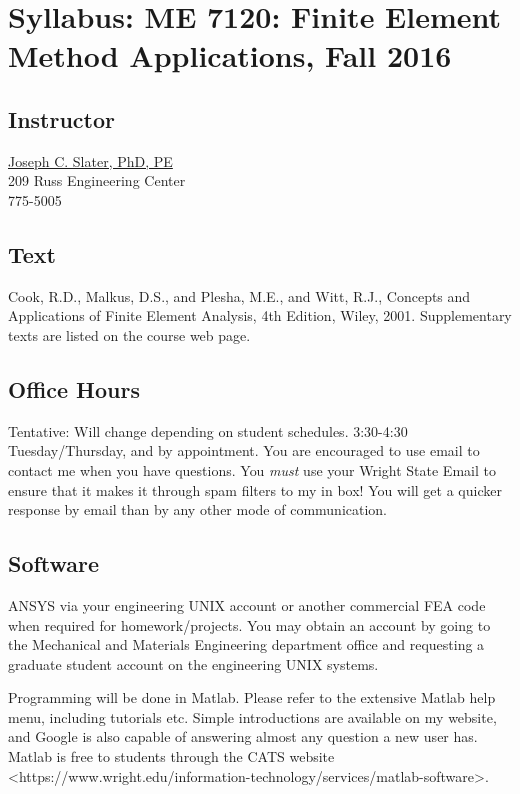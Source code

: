 \section{Syllabus: ME 7120: Finite Element Method Applications, Fall
2016}\label{syllabus-me-7120-finite-element-method-applications-fall-2016}

\subsection{Instructor}\label{instructor}

\href{http://www.cs.wright.edu/~jslater}{Joseph C. Slater, PhD, PE}\\
209 Russ Engineering Center\\
775-5005

\subsection{Text}\label{text}

Cook, R.D., Malkus, D.S., and Plesha, M.E., and Witt, R.J., Concepts and
Applications of Finite Element Analysis, 4th Edition, Wiley, 2001.
Supplementary texts are listed on the course web page.

\subsection{Office Hours}\label{office-hours}

Tentative: Will change depending on student schedules. 3:30-4:30
Tuesday/Thursday, and by appointment. You are encouraged to use email to
contact me when you have questions. You \emph{must} use your Wright
State Email to ensure that it makes it through spam filters to my in
box! You will get a quicker response by email than by any other mode of
communication.

\subsection{Software}\label{software}

ANSYS via your engineering UNIX account or another commercial FEA code
when required for homework/projects. You may obtain an account by going
to the Mechanical and Materials Engineering department office and
requesting a graduate student account on the engineering UNIX systems.

Programming will be done in Matlab. Please refer to the extensive Matlab
help menu, including tutorials etc. Simple introductions are available
on my website, and Google is also capable of answering almost any
question a new user has. Matlab is free to students through the
CATS website \textless{}https://www.wright.edu/information-technology/services/matlab-software\textgreater{}.


